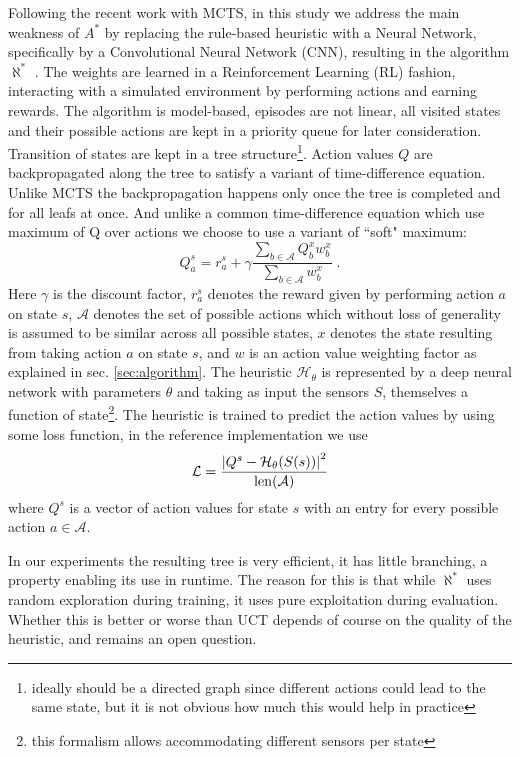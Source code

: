 \documentclass{article}
\newcommand{\alephstar}{$\aleph^*$ }
\newcommand{\astar}{$A^*$ }
\begin{document}
Following the recent work with MCTS, in this study we address the main weakness of \astar by replacing the rule-based heuristic with a Neural Network, specifically by a Convolutional Neural Network (CNN), resulting in the algorithm \alephstar. The weights are learned in a Reinforcement Learning (RL) fashion, interacting with a simulated environment by performing actions and earning rewards. The algorithm is model-based, episodes are not linear, all visited states and their possible actions are kept in a priority queue for later consideration. Transition of states are kept in a tree structure\footnote{ideally should be a directed graph since different actions could lead to the same state, but it is not obvious how much this would help in practice}. Action values $Q$ are backpropagated along the tree to satisfy a variant of time-difference equation. Unlike MCTS the backpropagation happens only once the tree is completed and for all leafs at once. And unlike a common time-difference equation which use maximum of Q over actions we choose to use a variant of ``soft" maximum:
\begin{equation}
  \label{eq:backprop}  
  Q^s_a = r^s_a + \gamma \frac{
    \sum_{b\in{\mathcal A}} {Q^x_b w^x_b}
  }{
    \sum_{b\in{\mathcal A}} {w^x_b}
  }\;.
\end{equation}
Here $\gamma$ is the discount factor, $r^s_a$ denotes the reward given by performing action $a$ on state $s$, ${\mathcal A}$ denotes the set of possible actions which without loss of generality is assumed to be similar across all possible states, $x$ denotes the state resulting from taking action $a$ on state $s$, and $w$ is an action value weighting factor as explained in sec. \ref{sec:algorithm}. The heuristic ${\mathcal H}_\theta$ is represented by a deep neural network with parameters $\theta$ and taking as input the sensors $S$, themselves a function of state\footnote{this formalism allows accommodating different sensors per state}. The heuristic is trained to predict the action values by using some loss function, in the reference implementation we use 
\begin{equation}
  \mathcal{L} = \frac{\left| Q^s - {\mathcal H}_\theta(S(s)) \right|^2}{{\rm len}({\mathcal A})}
\end{equation}
where $Q^s$ is a vector of action values for state $s$ with an entry for every possible action $a \in \mathcal{A}$.

In our experiments the resulting tree is very efficient, it has little branching, a property enabling its use in runtime. The reason for this is that while \alephstar uses random exploration during training, it uses pure exploitation during evaluation. Whether this is better or worse than UCT depends of course on the quality of the heuristic, and remains an open question.
\end{document}

